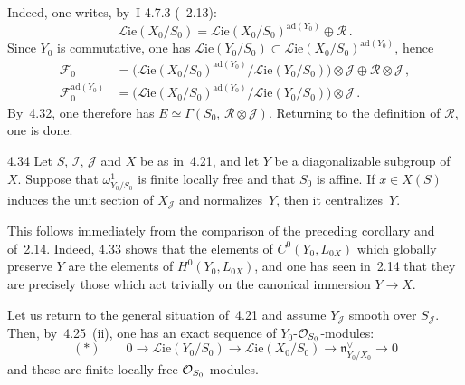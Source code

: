 Indeed, one writes, by~I 4.7.3 (\cf~2.13):
\[
\mathcal{L}\mathrm{ie}(X_{0}/S_{0})
=
\mathcal{L}\mathrm{ie}(X_{0}/S_{0})^{\mathrm{ad}(Y_{0})}
\oplus
\mathcal{R}\,.
\]
Since \(Y_{0}\) is commutative, one has
\(\mathcal{L}\mathrm{ie}(Y_{0}/S_{0})
\subset
\mathcal{L}\mathrm{ie}(X_{0}/S_{0})^{\mathrm{ad}(Y_{0})}\),
hence
\begin{align*}
\mathcal{F}_{0}
&=
\bigl(
\mathcal{L}\mathrm{ie}(X_{0}/S_{0})^{\mathrm{ad}(Y_{0})}
\big/
\mathcal{L}\mathrm{ie}(Y_{0}/S_{0})
\bigr)
\otimes\mathcal{J}
\oplus
\mathcal{R}\otimes\mathcal{J}\,,
\\
\mathcal{F}_{0}^{\mathrm{ad}(Y_{0})}
&=
\bigl(
\mathcal{L}\mathrm{ie}(X_{0}/S_{0})^{\mathrm{ad}(Y_{0})}
\big/
\mathcal{L}\mathrm{ie}(Y_{0}/S_{0})
\bigr)
\otimes\mathcal{J}\,.
\end{align*}
By~4.32, one therefore has \(E\simeq\Gamma(S_{0},\,\mathcal{R}\otimes\mathcal{J})\).
Returning to the definition of \(\mathcal{R}\), one is done.

\begin{corollary}{4.34}\label{III.4.34}
Let \(S\), \(\mathcal{I}\), \(\mathcal{J}\) and \(X\) be as in~4.21, and let
\(Y\) be a diagonalizable subgroup of~\(X\). Suppose that
\(\omega^{1}_{Y_{0}/S_{0}}\) is finite locally free and that \(S_{0}\) is
affine.%
{\renewcommand{\thefootnote}{(131)}}
If \(x\in X(S)\) induces the unit section of \(X_{\mathcal{J}}\) and
normalizes~\(Y\), then it centralizes~\(Y\).
\end{corollary}

This follows immediately from the comparison of the preceding corollary and
of~2.14. Indeed, 4.33 shows that the elements of \(C^{0}(Y_{0},L_{0X})\)
which globally preserve \(Y\) are the elements of \(H^{0}(Y_{0},L_{0X})\), and
one has seen in~2.14 that they are precisely those which act trivially on
the canonical immersion \(Y\to X\).

\label{III.4.35}
Let us return to the general situation of~4.21 and assume \(Y_{\mathcal{J}}\)
smooth over \(S_{\mathcal{J}}\). Then, by~4.25~(ii), one has an exact
sequence of \(Y_{0}\)-\(\mathcal{O}_{S_{0}}\)-modules:
\[
(*)\qquad
0\longrightarrow
\mathcal{L}\mathrm{ie}(Y_{0}/S_{0})
\longrightarrow
\mathcal{L}\mathrm{ie}(X_{0}/S_{0})
\longrightarrow
\mathfrak{n}^{\vee}_{Y_{0}/X_{0}}
\longrightarrow 0
\]
and these are finite locally free \(\mathcal{O}_{S_{0}}\)-modules.

